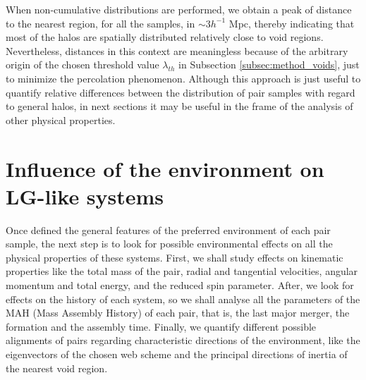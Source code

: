 \documentclass[a4,useAMS,usenatbib,usegraphicx]{latex/mn2e}
\begin{document}
\begin{flushleft}
\begin{figure}
\begin{center}

  \label{fig:voids2samples}
  \vspace{0.1 cm}

\end{center}
\end{figure}
\end{flushleft}



When non-cumulative distributions are performed, we obtain a peak of 
distance to the nearest region, for all the samples, in $\sim 3 h^{-1}$ 
Mpc, thereby indicating that most of the halos are spatially distributed 
relatively close to void regions. Nevertheless, distances in this context 
are meaningless because of the arbitrary origin of the chosen threshold 
value $\lambda_{th}$ in Subsection \ref{subsec:method_voids}, just to 
minimize the percolation phenomenon. Although this approach is just useful 
to quantify relative differences between the distribution of pair samples 
with regard to general halos, in next sections it may be useful in the frame
of the analysis of other physical properties. 



\section{Influence of the environment on LG-like systems}
\label{sec:influence_environment_LG}



Once defined the general features of the preferred environment of each 
pair sample, the next step is to look for possible environmental effects 
on all the physical properties of these systems. First, we shall study 
effects on kinematic properties like the total mass of the pair, radial 
and tangential velocities, angular momentum and total energy, and the 
reduced spin parameter. After, we look for effects on the history of 
each system, so we shall analyse all the parameters of the MAH (Mass 
Assembly History) of each pair, that is, the last major merger, the 
formation and the assembly time. Finally, we quantify different possible 
alignments of pairs regarding characteristic directions of the environment, 
like the eigenvectors of the chosen web scheme and the principal 
directions of inertia of the nearest void region.
\end{document}
